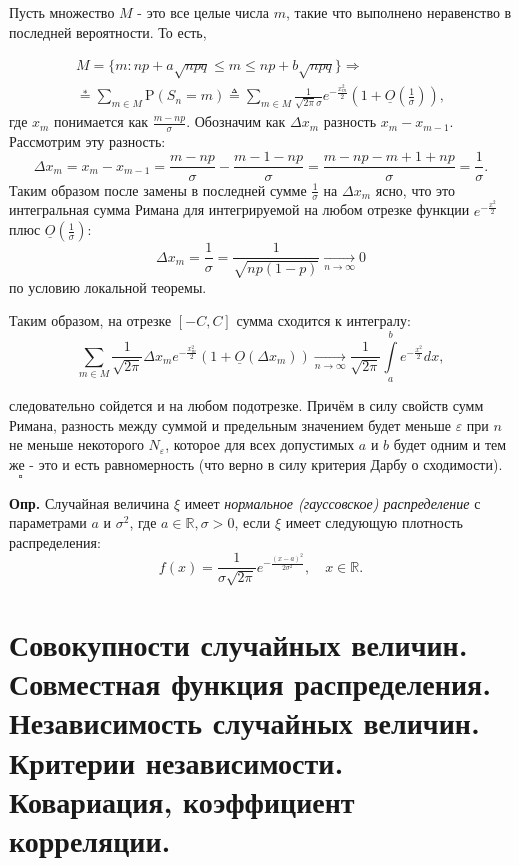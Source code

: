 \documentclass[oneside,final,14pt]{extreport}
\newcommand\mydef{{\bf Опр.}}
\theoremstyle{definition}
\begin{document}
Пусть множество $M$ - это все целые числа $m$, такие что выполнено неравенство в последней вероятности. То есть,

$$\begin{array}{c}
M=\{m: n p+a \sqrt{n p q} \leqslant m \leqslant n p+b \sqrt{n p q}\} \Rightarrow \\
\stackrel{*}{=} \sum\limits_{m \in M} \mathrm{P}\left(S_{n}=m\right) \triangleq \sum_{m \in M} \frac{1}{\sqrt{2 \pi} \sigma} e^{-\frac{x_{m}^{2}}{2}}\left(1+\underline{O}\left(\frac{1}{\sigma}\right)\right),
\end{array}$$
где $x_m$ понимается как $\frac{m - np}{\sigma}.$ Обозначим как $\Delta x_{m}$ разность $x_m - x_{m-1}.$ Рассмотрим эту разность:
$$\Delta x_{m}=x_{m}-x_{m-1}=\frac{m-n p}{\sigma}-\frac{m-1-n p}{\sigma}=\frac{m-n p-m+1+n p}{\sigma}=\frac{1}{\sigma}.$$
Таким образом после замены в последней сумме $\frac{1}{\sigma}$ на $\Delta x_m$ ясно, что это интегральная сумма Римана для интегрируемой на любом отрезке функции $e^{-\frac{x^2}{2}}$ плюс $\underline{O}\left(\frac{1}{\sigma}\right)$:
$$\Delta x_{m}=\frac{1}{\sigma}=\frac{1}{\sqrt{n p(1-p)}} \underset{n \to \infty}{\longrightarrow} 0$$ по условию локальной теоремы.

Таким образом, на отрезке $[-C,C]$ сумма сходится к интегралу:
$$\sum_{m \in M} \frac{1}{\sqrt{2 \pi}} \Delta x_{m} e^{-\frac{x_{m}^{2}}{2}}\left(1+\underline{O}\left(\Delta x_{m}\right)\right) \underset{n \to \infty}{\longrightarrow} \frac{1}{\sqrt{2 \pi}} \int\limits_{a}^{b} e^{-\frac{x^{2}}{2}} d x,$$

следовательно сойдется и на любом подотрезке. Причём в
силу свойств сумм Римана, разность между суммой и предельным значением будет
меньше $\varepsilon$ при $n$ не меньше некоторого $N_\varepsilon$, которое для всех допустимых $a$ и $b$ будет одним и тем же - это и есть равномерность (что верно в силу критерия Дарбу о сходимости). $~~~ \square$

\mydef{} Случайная величина $\xi$ имеет {\it нормальное (гауссовское) распределение} с параметрами $a$ и $\sigma^2$, где $a \in \mathbb{R}, \sigma > 0$, если $\xi$ имеет следующую плотность распределения: 
$$f(x)=\frac{1}{\sigma \sqrt{2 \pi}} e^{-\frac{(x-a)^{2}}{2 \sigma^{2}}}, \quad x \in \mathbb{R}.$$

\section{Совокупности случайных величин. Совместная функция распределения. Независимость случайных величин. Критерии независимости. Ковариация, коэффициент корреляции.}
\end{document}
